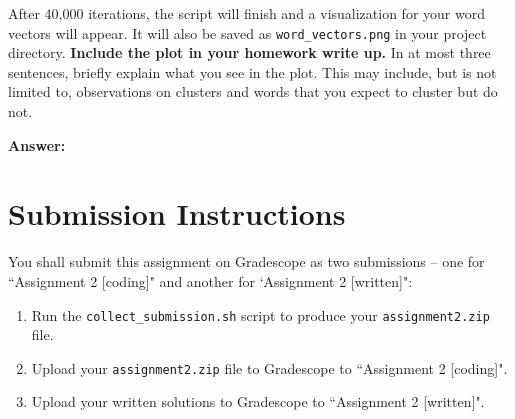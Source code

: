\documentclass{article}
\newenvironment{answer}{
    {\bf Answer:} \sf \begingroup\color{black}
}{\endgroup}%
\begin{document}
\begin{enumerate}[label=(\alph*)]
    After 40,000 iterations, the script will finish and a visualization for your word vectors will appear. It will also be saved as \texttt{word\_vectors.png} in your project directory. \textbf{Include the plot in your homework write up.} In at most three sentences, briefly explain what you see in the plot. This may include, but is not limited to, observations on clusters and words that you expect to cluster but do not.
    
\begin{shaded}
\begin{answer}

\end{answer}
\end{shaded}

\section{Submission Instructions}
You shall submit this assignment on Gradescope as two submissions -- one for ``Assignment 2 [coding]" and another for `Assignment 2 [written]":
\begin{enumerate}
    \item Run the \texttt{collect\_submission.sh} script to produce your \texttt{assignment2.zip} file.
    \item Upload your \texttt{assignment2.zip} file to Gradescope to ``Assignment 2 [coding]".
    \item Upload your written solutions to Gradescope to ``Assignment 2 [written]".
\end{enumerate}

\end{enumerate}
\end{document}
